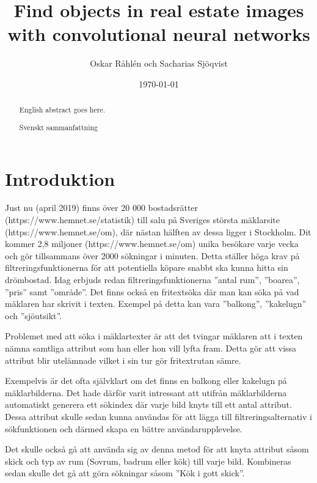 \documentclass{kththesis}
\title{Find objects in real estate images with convolutional neural networks}
\author{Oskar Råhlén och Sacharias Sjöqvist}
\date{\today}
\begin{document}
\frontmatter

\titlepage

\begin{abstract}
  English abstract goes here.
\end{abstract}

\begin{otherlanguage}{swedish}
  \begin{abstract}
    Svenskt sammanfattning
  \end{abstract}
\end{otherlanguage}

\tableofcontents

\mainmatter


\chapter{Introduktion}

Just nu (april 2019) finns över 20 000 bostadsrätter (https://www.hemnet.se/statistik) till salu på Sveriges största mäklarsite (https://www.hemnet.se/om), där nästan hälften av dessa ligger i Stockholm. 
Dit kommer 2,8 miljoner (https://www.hemnet.se/om) unika besökare varje vecka och gör tillsammans över 2000 sökningar i minuten.
Detta ställer höga krav på filtreringsfunktionerna för att potentiella köpare snabbt ska kunna hitta sin drömbostad.
Idag erbjuds redan filtreringsfunktionerna ”antal rum”, ”boarea”, ”pris” samt ”område”. 
Det finns också en fritextsöka där man kan söka på vad mäklaren har skrivit i texten.
Exempel på detta kan vara ”balkong”, ”kakelugn” och ”sjöutsikt”. 

Problemet med att söka i mäklartexter är att det tvingar mäklaren att i texten nämna samtliga attribut som han eller hon vill lyfta fram. 
Detta gör att vissa attribut blir utelämnade vilket i sin tur gör fritextrutan sämre.

Exempelvis är det ofta självklart om det finns en balkong eller kakelugn på mäklarbilderna.
Det hade därför varit intressant att utifrån mäklarbilderna automatiskt generera ett sökindex där varje bild knyts till ett antal attribut.
Dessa attribut skulle sedan kunna användas för att lägga till filtreringsalternativ i sökfunktionen och därmed skapa en bättre användarupplevelse.

Det skulle också gå att använda sig av denna metod för att knyta attribut såsom skick och typ av rum (Sovrum, badrum eller kök) till varje bild.
Kombineras sedan skulle det gå att göra sökningar såsom ”Kök i gott skick”.  
\end{document}
